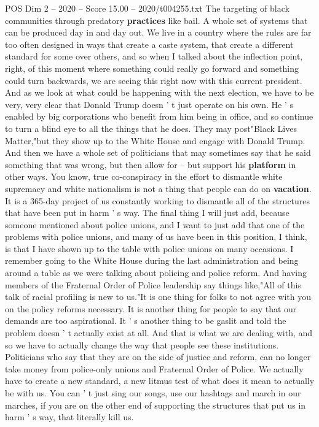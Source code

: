 \begin{textsample}{POS Dim 2 – 2020 – Score 15.00 – 2020/t004255.txt}
The targeting of black communities through predatory \textbf{practices} like bail.
A whole set of systems that can be produced day in and day out.
We live in a country where the rules are far too often designed in ways that create a caste system, that create a different standard for some over others, and so when I talked about the inflection point, right, of this moment where something could really go forward and something could turn backwards, we are seeing this right now with this current president.
And as we look at what could be happening with the next election, we have to be very, very clear that Donald Trump doesn ' t just operate on his own.
He ' s enabled by big corporations who benefit from him being in office, and so continue to turn a blind eye to all the things that he does.
They may post"Black Lives Matter,"but they show up to the White House and engage with Donald Trump.
And then we have a whole set of politicians that may sometimes say that he said something that was wrong, but then allow for -- but support his \textbf{platform} in other ways.
You know, true co-conspiracy in the effort to dismantle white supremacy and white nationalism is not a thing that people can do on \textbf{vacation}.
It is a 365-day project of us constantly working to dismantle all of the structures that have been put in harm ' s way.
The final thing I will just add, because someone mentioned about police unions, and I want to just add that one of the problems with police unions, and many of us have been in this position, I think, is that I have shown up to the table with police unions on many occasions.
I remember going to the White House during the last administration and being around a table as we were talking about policing and police reform.
And having members of the Fraternal Order of Police leadership say things like,"All of this talk of racial profiling is new to us."It is one thing for folks to not agree with you on the policy reforms necessary.
It is another thing for people to say that our demands are too aspirational.
It ' s another thing to be gaslit and told the problem doesn ' t actually exist at all.
And that is what we are dealing with, and so we have to actually change the way that people see these institutions.
Politicians who say that they are on the side of justice and reform, can no longer take money from police-only unions and Fraternal Order of Police.
We actually have to create a new standard, a new litmus test of what does it mean to actually be with us.
You can ' t just sing our songs, use our hashtags and march in our marches, if you are on the other end of supporting the structures that put us in harm ' s way, that literally kill us.

\end{textsample}
